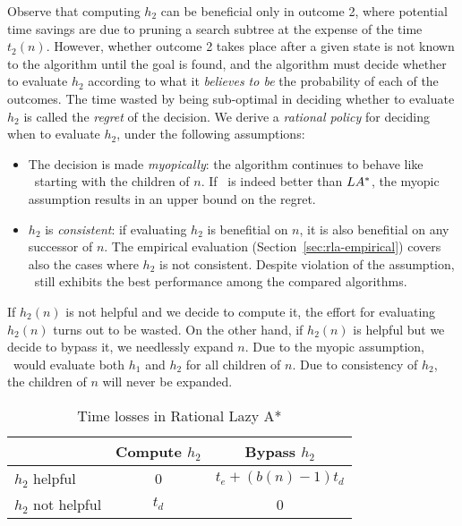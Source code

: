 Observe that computing $h_2$ can be beneficial only in outcome 2,
where potential time savings are due to pruning a search subtree at
the expense of the time $t_2(n)$. However, whether outcome 2 takes
place after a given state is not known to the algorithm until the goal
is found, and the algorithm must decide whether to evaluate $h_2$
according to what it \textit{believes to be} the probability of each
of the outcomes. The time wasted by being sub-optimal in deciding
whether to evaluate $h_2$ is called the {\em regret} of the decision.
We derive a \textit{rational policy} for deciding when to evaluate
$h_2$, under the following assumptions:
\begin{itemize}
\item The decision is made \textit{myopically}: the algorithm continues to
  behave like \lazyastar~starting with the children of
  $n$. If \rationallazyastar~is indeed better than $LA^\ast$, the
  myopic assumption results in an upper bound on the regret.
\item $h_2$ is \textit{consistent}: if evaluating $h_2$ is benefitial
  on $n$, it is also benefitial on any successor of $n$. The empirical
  evaluation (Section~\ref{sec:rla-empirical}) covers also the cases
  where $h_2$ is not consistent. Despite violation of the assumption,
  \rationallazyastar~still exhibits the best performance among
  the compared algorithms.
\end{itemize}

If $h_2(n)$ is not helpful and we decide to compute it, the effort for evaluating
$h_2(n)$ turns out to be wasted. On the other hand, if $h_2(n)$ is
helpful but we decide to bypass it, we needlessly expand $n$. Due to
the myopic assumption, \rationallazyastar~would evaluate both $h_1$
and $h_2$ for all children of $n$. Due to consistency of $h_2$,
the children of $n$ will never be expanded.
\begin{table}[h!]
\begin{center}
\begin{tabular}{|l|c|c|}
\hline
               & Compute $h_2$ & Bypass $h_2$\\
\hline
$h_2$ helpful &   0            & $t_e+(b(n)-1)t_d$\\
\hline
$h_2$ not helpful & $t_d$      & 0 \\
\hline
\end{tabular}
\end{center}
\caption{Time losses in Rational Lazy A*}
\label{tbl:rla-rational-lazy-a-time}
\end{table}

